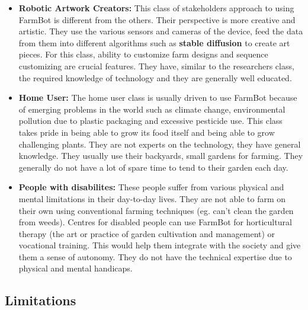 \begin{itemize}
    \item \textbf{Robotic Artwork Creators:} This class of stakeholders approach to using FarmBot is different from the others. Their perspective is more creative and artistic. They use the various sensors and cameras of the device, feed the data from them into different algorithms such as \textbf{stable diffusion} to create art pieces. For this class, ability to customize farm designs and sequence customizing are crucial features. They have, similar to the researchers class, the required knowledge of technology and they are generally well educated.  

    \item \textbf{Home User:} The home user class is usually driven to use FarmBot because of emerging problems in the world such as climate change, environmental pollution due to plastic packaging and excessive pesticide use. This class takes pride in being able to grow its food itself and being able to grow challenging plants. They are not experts on the technology, they have general knowledge. They usually use their backyards, small gardens for farming. They generally do not have a lot of spare time to tend to their garden each day.

    \item \textbf{People with disabilites:} These people suffer from various physical and mental limitations in their day-to-day lives. They are not able to farm on their own using conventional farming techniques (eg. can't clean the garden from weeds). Centres for disabled people can use FarmBot for horticultural therapy (the art or practice of garden cultivation and management) or vocational training. This would help them integrate with the society and give them a sense of autonomy. They do not have the technical expertise due to physical and mental handicaps. 

\end{itemize}

\subsection{Limitations}

